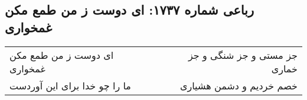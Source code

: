 \begin{center}
\section*{رباعی شماره ۱۷۳۷: ای دوست ز من طمع مکن غمخواری}
\label{sec:1737}
\begin{longtable}{l p{0.5cm} r}
ای دوست ز من طمع مکن غمخواری
&&
جز مستی و جز شنگی و جز خماری
\\
ما را چو خدا برای این آوردست
&&
خصم خردیم و دشمن هشیاری
\\
\end{longtable}
\end{center}
